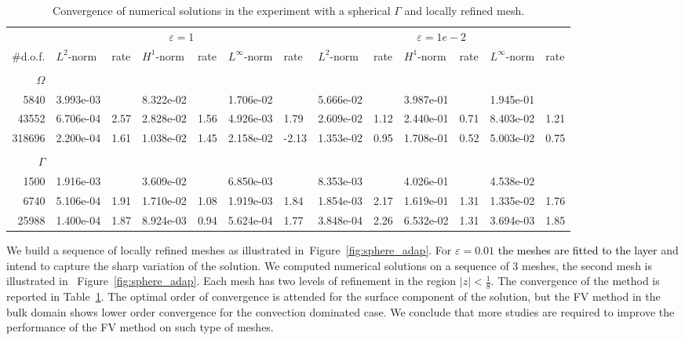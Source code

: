 \documentclass{article}
\newcommand{\rev}[1]{\textcolor{black}{{#1}}}
\let\eps\varepsilon
\begin{document}
{\begin{table}
\begin{center}
\caption{Convergence of numerical solutions in the experiment with a spherical $\Gamma$ and locally refined mesh.
\label{tab:sphere_adap}  }\smallskip
\small
\begin{tabular}{r|llllll|llllll}\hline
&\multicolumn{6}{|c|}{$\varepsilon=1$}&\multicolumn{6}{|c}{$\varepsilon=1e-2$}\\
\#d.o.f. & $L^2$-norm & rate & $H^1$-norm& rate & $L^\infty$-norm& rate& $L^2$-norm & rate & $H^1$-norm& rate & $L^\infty$-norm& rate \\ \hline\\[-2ex]
{$\Omega$}&&&&&&&&&&&&\\
5840  &   3.993e-03&       &  8.322e-02&        &  1.706e-02&      &   5.666e-02&       &  3.987e-01&        &  1.945e-01&     \\
43552 &   6.706e-04&2.57   &  2.828e-02&1.56    &  4.926e-03& 1.79 &   2.609e-02&1.12   &  2.440e-01&0.71    &  8.403e-02&1.21 \\
318696&   2.200e-04&1.61   &  1.038e-02&1.45    &  2.158e-02&-2.13 &   1.353e-02&0.95   &  1.708e-01&0.52    &  5.003e-02&0.75 \\  \hline\\[-2ex]
{$\Gamma$} &&&&&&&&&&&&\\
1500 &       1.916e-03&    &   3.609e-02&     & 6.850e-03&    &    8.353e-03&    &  4.026e-01&     & 4.538e-02&     \\
6740 &       5.106e-04&1.91&   1.710e-02&1.08 & 1.919e-03&1.84&    1.854e-03&2.17&  1.619e-01&1.31 & 1.335e-02&1.76 \\
25988&       1.400e-04&1.87&   8.924e-03&0.94 & 5.624e-04&1.77&    3.848e-04&2.26&  6.532e-02&1.31 & 3.694e-03&1.85 \\  \hline
\end{tabular}
\end{center}
\end{table}


We build a sequence of locally refined meshes as illustrated in~Figure~\ref{fig:sphere_adap}.
For $\eps=0.01$ \rev{the meshes are fitted to the layer} and intend  to capture the sharp variation of the solution.
We computed numerical solutions on a sequence of 3 meshes, the second mesh is illustrated in ~Figure~\ref{fig:sphere_adap}. Each mesh has two levels of refinement in the region $|z|<\frac18$.
The convergence of the method is reported in Table~\ref{tab:sphere_adap}. The optimal order of convergence is attended for the surface component of the solution, but the FV method in the bulk domain shows lower order convergence for the convection dominated case. We conclude that more studies are required to improve the performance of the FV method on such type of meshes.

}
\end{document}
